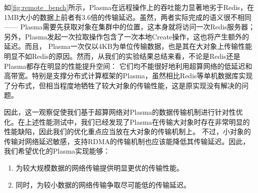 如\autoref{fig:remote_bench}所示，Plasma在远程操作上的吞吐能力显著地劣于Redis，在1MB大小的数据上前者有3.6倍的传输延迟。虽然，两者实际完成的语义很不相同——
Plasma需要先获取对象在集群中的位置，这本身就将访问一次Redis服务器；另外，Plasma发起一次拉取操作包含了一次本地Create操作，这也将产生额外的延迟。而且，
Plasma一次仅以4KB为单位传输数据，也是其在大对象上传输性能明显不如Redis的原因。然而，从我们的实验结果总结来看，不论是Redis还是Plasma都存在明显的性能提升空间：
它们均不能很好地利用超算网络的低延迟和高带宽。特别是支撑分布式计算框架的Plasma，虽然相比Redis等单机数据库实现了分布式，但相当程度地牺牲了较大对象的传输性能，这是原实现没有解决的问题。

因此，这一观察促使我们基于超算网络对Plasma的数据传输机制进行针对性优化。在上述性能测试中，我们已经发现了Plasma在传输大对象时存在非常明显的性能缺陷，因此我们的优化重点应当放在大对象的传输机制上。
不过，小对象的传输对网络延迟敏感，支持RDMA的传输机制也应该能降低其传输延迟。因此，我们希望优化的Plasma实现能够：

\begin{enumerate}
    \item 为较大规模数据的网络传输提供明显更优的传输性能。
    \item 同时，为较小数据的网络传输争取尽可能低的传输延迟。
\end{enumerate}